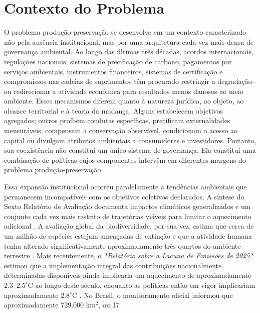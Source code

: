 \section{Contexto do Problema}


O problema produção-preservação se desenvolve em um contexto caracterizado não pela ausência institucional, mas por uma arquitetura cada vez mais densa de governança ambiental. Ao longo das últimas três décadas, acordos internacionais, regulações nacionais, sistemas de precificação de carbono, pagamentos por serviços ambientais, instrumentos financeiros, sistemas de certificação e compromissos nas cadeias de suprimentos têm procurado restringir a degradação ou redirecionar a atividade econômica para resultados menos danosos ao meio ambiente. Esses mecanismos diferem quanto à natureza jurídica, ao objeto, ao alcance territorial e à teoria da mudança. Alguns estabelecem objetivos agregados; outros proíbem condutas específicas, precificam externalidades mensuráveis, compensam a conservação observável, condicionam o acesso ao capital ou divulgam atributos ambientais a consumidores e investidores. Portanto, sua coexistência não constitui um único sistema de governança. Ela constitui uma combinação de políticas cujos componentes intervêm em diferentes margens do problema produção-preservação.

Essa expansão institucional ocorreu paralelamente a tendências ambientais que permanecem incompatíveis com os objetivos coletivos declarados. A síntese do Sexto Relatório de Avaliação documenta impactos climáticos generalizados e um conjunto cada vez mais restrito de trajetórias viáveis para limitar o aquecimento adicional \cite{ipcc2023synthesis}. A avaliação global da biodiversidade, por sua vez, estima que cerca de um milhão de espécies estejam ameaçadas de extinção e que a atividade humana tenha alterado significativamente aproximadamente três quartos do ambiente terrestre \cite{ipbes2019global}. Mais recentemente, o \textit{*Relatório sobre a Lacuna de Emissões de 2025*} estimou que a implementação integral das contribuições nacionalmente determinadas disponíveis ainda implicaria um aquecimento de aproximadamente $2.3$--$2.5^{\circ}\mathrm{C}$ ao longo deste século, enquanto as políticas então em vigor implicariam aproximadamente $2.8^{\circ}\mathrm{C}$ \cite{unep2025emissions}. No Brasil, o monitoramento oficial informou que aproximadamente 729.000 km$^{2}$, ou 17\\%

